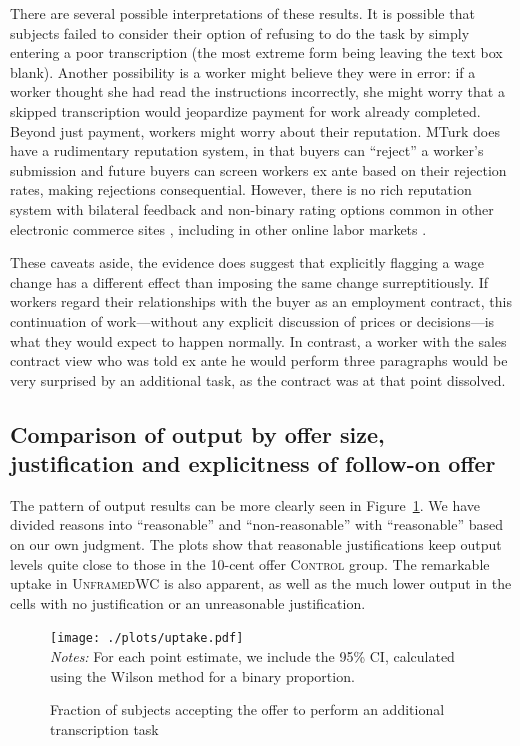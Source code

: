 \documentclass[11pt]{article}
\begin{document}
There are several possible interpretations of these results. 
It is possible that subjects failed to consider their option of refusing to do the task by simply entering a poor transcription (the most extreme form being leaving the text box blank).  
Another possibility is a worker might believe they were in error: if a worker thought she had read the instructions incorrectly, she might worry that a skipped transcription would jeopardize payment for work already completed.
Beyond just payment, workers might worry about their reputation.
MTurk does have a rudimentary reputation system, in that buyers can ``reject'' a worker's submission and future buyers can screen workers ex ante based on their rejection rates, making rejections consequential.
However, there is no rich reputation system with bilateral feedback and non-binary rating options common in other electronic commerce sites \citep{dellarocas2006reputation}, including in other online labor markets \citep{moreno2014}. 

These caveats aside, the evidence does suggest that explicitly flagging a wage change has a different effect than imposing the same change surreptitiously. 
If workers regard their relationships with the buyer as an employment contract, this continuation of work---without any explicit discussion of prices or decisions---is what they would expect to happen normally.
In contrast, a worker with the sales contract view who was told ex ante he would perform three paragraphs would be very surprised by an additional task, as the contract was at that point dissolved. 

\subsection{Comparison of output by offer size, justification and explicitness of follow-on offer}
The pattern of output results can be more clearly seen in Figure~\ref{fig:response}. 
We have divided reasons into ``reasonable'' and ``non-reasonable'' with ``reasonable'' based on our own judgment. 
The plots show that reasonable justifications keep output levels quite close to those in the 10-cent offer \textsc{Control} group.
The remarkable uptake in \textsc{UnframedWC} is also apparent, as well as the much lower output in the cells with no justification or an unreasonable justification. 

\begin{figure}
  \caption{Fraction of subjects accepting the offer to perform an additional transcription task \label{fig:response}} 
\centering
\begin{minipage}{0.85 \linewidth}
    \texttt{[image: ./plots/uptake.pdf]}
\\
\footnotesize
\emph{Notes:} For each point estimate, we include the 95\% CI, calculated using the Wilson method for a binary proportion.  
\end{minipage}
\end{figure}   
\end{document}
